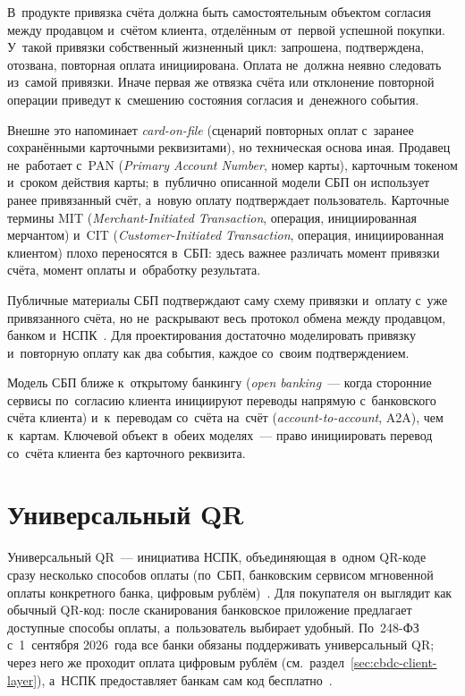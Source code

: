 В~продукте привязка счёта должна быть самостоятельным объектом согласия между
продавцом и~счётом клиента, отделённым от~первой успешной покупки. У~такой
привязки собственный жизненный цикл: запрошена, подтверждена, отозвана,
повторная оплата инициирована. Оплата не~должна неявно следовать из~самой
привязки. Иначе первая же отвязка счёта или отклонение повторной операции
приведут к~смешению состояния согласия и~денежного события.

Внешне это напоминает \textit{card-on-file} (сценарий повторных оплат с~заранее
сохранёнными карточными реквизитами), но техническая основа иная. Продавец
не~работает с~PAN (\textit{Primary Account Number}, номер карты), карточным токеном
и~сроком действия карты; в~публично описанной модели СБП он использует ранее
привязанный счёт, а~новую оплату подтверждает пользователь. Карточные термины
MIT (\textit{Merchant-Initiated Transaction}, операция, инициированная мерчантом)
и~CIT (\textit{Customer-Initiated Transaction}, операция, инициированная клиентом)
плохо переносятся в~СБП: здесь важнее различать момент привязки счёта, момент
оплаты и~обработку результата.

Публичные материалы СБП подтверждают саму схему привязки и~оплату с~уже
привязанного счёта, но не~раскрывают весь протокол обмена между
продавцом, банком и~НСПК~\cite{sbp-main}. Для проектирования достаточно
моделировать привязку и~повторную оплату как два события, каждое со~своим
подтверждением.

Модель СБП ближе к~открытому банкингу (\textit{open banking}~--- когда
  сторонние сервисы по~согласию клиента инициируют переводы напрямую
с~банковского счёта клиента) и~к~переводам со~счёта на~счёт (\textit{account-to-account},
A2A), чем к~картам. Ключевой объект в~обеих моделях~--- право инициировать
перевод со~счёта клиента без карточного реквизита.

\section{Универсальный QR}\label{sec:sbp-universal-qr}

Универсальный QR~--- инициатива НСПК, объединяющая в~одном QR-коде сразу
несколько способов оплаты (по~СБП, банковским сервисом мгновенной оплаты
конкретного банка, цифровым рублём)~\cite{nspk-universal-qr}. Для
покупателя он выглядит как обычный QR-код: после сканирования банковское
приложение предлагает доступные способы оплаты, а~пользователь выбирает
удобный. По~248-ФЗ с~1~сентября 2026~года все банки обязаны поддерживать
универсальный QR; через него же проходит оплата цифровым рублём
(см.~раздел~\ref{sec:cbdc-client-layer}), а~НСПК предоставляет банкам сам код
бесплатно~\cite{fz-248,cbr-mass-rollout-2025}.


